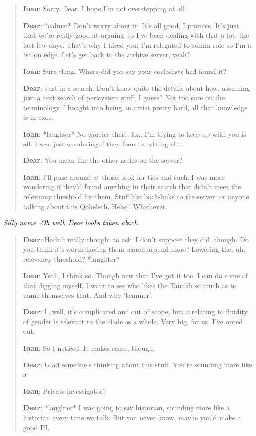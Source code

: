 \begin{quote}
\textbf{Ioan}: Sorry, Dear. I hope I'm not overstepping at all.

\textbf{Dear}: *calmer* Don't worry about it. It's all good, I promise. It's just that we're really good at arguing, so I've been dealing with that a lot, the last few days. That's why I hired you; I'm relegated to admin role so I'm a bit on edge. Let's get back to the archive server, yeah?

\textbf{Ioan}: Sure thing. Where did you say your cocladists had found it?

\textbf{Dear}: Just in a search. Don't know quite the details about how, assuming just a text search of perisystem stuff, I guess? Not too sure on the terminology, I bought into being an artist pretty hard, all that knowledge is in exos.

\textbf{Ioan}: *laughter* No worries there, fox. I'm trying to keep up with you is all. I was just wondering if they found anything else.

\textbf{Dear}: You mean like the other nodes on the server?

\textbf{Ioan}: I'll poke around at those, look for ties and such. I was more wondering if they'd found anything in their search that didn't meet the relevancy threshold for them. Stuff like back-links to the server, or anyone talking about this Qoheleth. Hebel. Whichever.
\end{quote}

\emph{Silly name. Oh well. Dear looks taken aback.}

\begin{quote}
\textbf{Dear}: Hadn't really thought to ask. I don't suppose they did, though. Do you think it's worth having them search around more? Lowering the, uh, relevancy threshold? *laughter*

\textbf{Ioan}: Yeah, I think so. Though now that I've got it too, I can do some of that digging myself. I want to see who likes the Tanakh so much as to name themselves that. And why `kemmer'.

\textbf{Dear}: I\ldots{}well, it's complicated and out of scope, but it relating to fluidity of gender is relevant to the clade as a whole. Very big, for us. I've opted out.

\textbf{Ioan}: So I noticed. It makes sense, though.

\textbf{Dear}: Glad someone's thinking about this stuff. You're sounding more like a--

\textbf{Ioan}: Private investigator?

\textbf{Dear}: *laughter* I was going to say historian, sounding more like a historian every time we talk. But you never know, maybe you'd make a good PI.
\end{quote}


